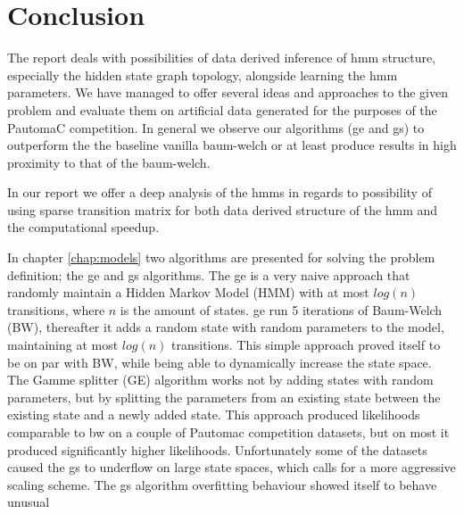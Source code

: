 \chapter{Conclusion}
\label{chap:conclusion}
The report deals with possibilities of data derived inference of \gls{hmm} structure, especially the hidden state graph topology, alongside learning the \gls{hmm} parameters. We have managed to offer several ideas and approaches to the given problem and evaluate them on artificial data generated for the purposes of the PautomaC competition. In general we observe our algorithms (\acrfull{ge} and \acrfull{gs}) to outperform the the baseline vanilla \gls{baum-welch} or at least produce results in high proximity to that of the \gls{baum-welch}.

In our report we offer a deep analysis of the \glspl{hmm} in regards to possibility of using sparse transition matrix for both data derived structure of the \gls{hmm} and the computational speedup.

In chapter \ref{chap:models} two algorithms are presented for solving the problem definition; the \acrfull{ge} and \acrfull{gs} algorithms. The \gls{ge} is a very naive approach that randomly maintain a Hidden Markov Model (HMM) with at most $log(n)$ transitions, where $n$ is the amount of states. \gls{ge} run 5 iterations of Baum-Welch (BW), thereafter it adds a random state with random parameters to the model, maintaining at most $log(n)$ transitions. This simple approach proved itself to be on par with BW, while being able to dynamically increase the state space. The Gamme splitter (GE) algorithm works not by adding states with random parameters, but by splitting the parameters from an existing state between the existing state and a newly added state. This approach produced likelihoods comparable to \gls{bw} on a couple of Pautomac competition datasets, but on most it produced significantly higher likelihoods. Unfortunately some of the datasets caused the \gls{gs} to underflow on large state spaces, which calls for a more aggressive scaling scheme.
The \gls{gs} algorithm overfitting behaviour showed itself to behave unusual
